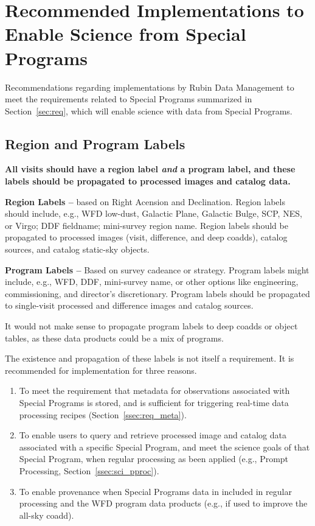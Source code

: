 \section{Recommended Implementations to Enable Science from Special Programs}\label{sec:sci}

Recommendations regarding implementations by Rubin Data Management to meet the 
requirements related to Special Programs summarized in Section~\ref{sec:req},
which will enable science with data from Special Programs.

\subsection{Region and Program Labels}\label{ssec:sci_labels}

\textbf{All visits should have a region label \textit{and} a program 
label, and these labels should be propagated to processed images and catalog data.}

\textbf{Region Labels -- } based on Right Acension and Declination.
Region labels should include, e.g., WFD low-dust, Galactic Plane, Galactic 
Bulge, SCP, NES, or Virgo; DDF fieldname; mini-survey region name.
Region labels should be propagated to processed images (visit, 
difference, and deep coadds), catalog sources, and catalog static-sky objects. 

\textbf{Program Labels -- } 
Based on survey cadeance or strategy.
Program labels might include, e.g., WFD, DDF, mini-survey name, or other 
options like engineering, commissioning, and director's discretionary.
Program labels should be propagated to single-visit processed and 
difference images and catalog sources.

It would not make sense to propagate program labels to deep coadds or 
object tables, as these data products could be a mix of programs.

The existence and propagation of these labels is not itself a requirement.
It is recommended for implementation for three reasons.

\begin{enumerate}

\item To meet the requirement that metadata for observations associated 
with Special Programs is stored, and is sufficient for triggering 
real-time data processing recipes (Section~\ref{ssec:req_meta}).

\item To enable users to query and retrieve processed image and catalog
data associated with a specific Special Program, and meet the science goals
of that Special Program, when regular processing as been applied 
(e.g., Prompt Processing, Section~\ref{ssec:sci_pproc}).

\item To enable provenance when Special Programs data in included in regular
processing and the WFD program data products (e.g., if used to improve the
all-sky coadd).

\end{enumerate}

